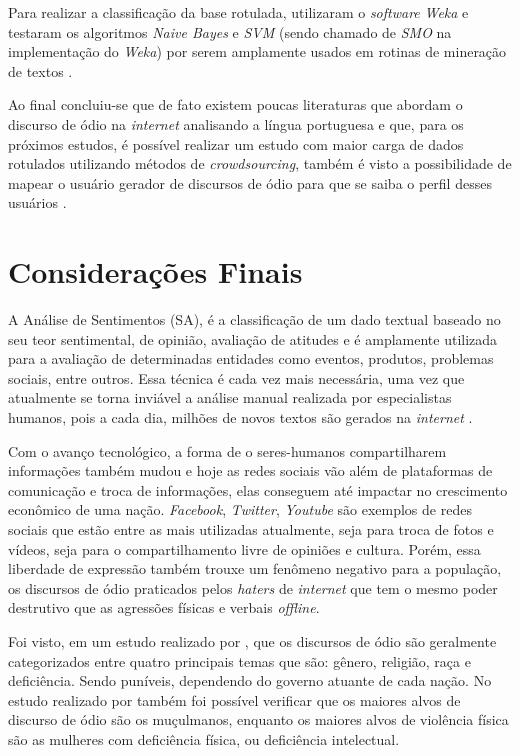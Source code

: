 Para realizar a classificação da base rotulada,  utilizaram o \textit{software} \textit{Weka} e testaram os algoritmos \textit{Naive Bayes} e \textit{SVM} (sendo chamado de \textit{SMO} na implementação do \textit{Weka}) por serem amplamente usados em rotinas de mineração de textos \cite{Pelle2017}. 

Ao final concluiu-se que de fato existem poucas literaturas que abordam o discurso de ódio na \textit{internet} analisando a língua portuguesa e que, para os próximos estudos, é possível realizar um estudo com maior carga de dados rotulados utilizando métodos de \textit{crowdsourcing}, também é visto a possibilidade de mapear o usuário gerador de discursos de ódio para que se saiba o perfil desses usuários \cite{Pelle2017}.

\section{Considerações Finais}
A Análise de Sentimentos (SA), é a classificação de um dado textual baseado no seu teor sentimental, de opinião, avaliação de atitudes e é amplamente utilizada para a avaliação de determinadas entidades como eventos, produtos, problemas sociais, entre outros. Essa técnica é cada vez mais necessária, uma vez que atualmente se torna inviável a análise manual realizada por especialistas humanos, pois a cada dia, milhões de novos textos são gerados na \textit{internet} \cite{BAHRI2018669}.

Com o avanço tecnológico, a forma de o seres-humanos compartilharem informações também mudou e hoje as redes sociais vão além de plataformas de comunicação e troca de informações, elas conseguem até impactar no crescimento econômico de uma nação. \textit{Facebook}, \textit{Twitter}, \textit{Youtube} são exemplos de redes sociais que estão entre as mais utilizadas atualmente, seja para troca de fotos e vídeos, seja para o compartilhamento livre de opiniões e cultura. Porém, essa liberdade de expressão também trouxe um fenômeno negativo para a população, os discursos de ódio praticados pelos \textit{haters} de \textit{internet} que tem o mesmo poder destrutivo que as agressões físicas e verbais \textit{offline}. 

Foi visto, em um estudo realizado por , que os discursos de ódio são geralmente categorizados entre quatro principais temas que são: gênero, religião, raça e deficiência. Sendo puníveis, dependendo do governo atuante de cada nação. No estudo realizado por  também foi possível verificar que os maiores alvos de discurso de ódio são os muçulmanos, enquanto os maiores alvos de violência física são as mulheres com deficiência física, ou deficiência intelectual.

